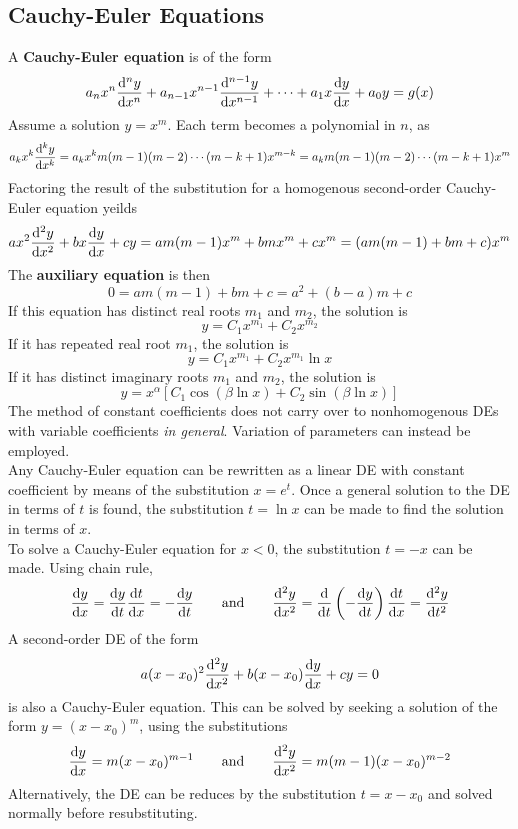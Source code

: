 \documentclass[12pt, A4]{article}
\begin{document}
		\subsection{Cauchy-Euler Equations}
			A \textbf{Cauchy-Euler equation} is of the form
				\[a_nx^n\dv[n]{y}{x} + a_{n - 1}x^{n - 1}\dv[n - 1]{y}{x} + \cdots + a_1x\dv{y}{x} + a_0y = g(x)\]
				Assume a solution \(y = x^m\). Each term becomes a polynomial in \(n\), as
				\[
					a_kx^k\dv[k]{y}{x} 
						= a_kx^km(m - 1)(m - 2)\cdots(m - k + 1)x^{m - k} 
						= a_km(m - 1)(m - 2)\cdots(m - k + 1)x^m
				\]
				Factoring the result of the substitution for a homogenous second-order Cauchy-Euler equation yeilds
				\[
					ax^2\dv[2]{y}{x} + bx\dv{y}{x} + cy
						= am(m - 1)x^m + bmx^m + cx^m
						= (am(m - 1) + bm + c)x^m
				\]
				The \textbf{auxiliary equation} is then
				\[\boxed{
					0 = am(m - 1) + bm + c = a^2 + (b - a)m + c
				}\]
				If this equation has distinct real roots \(m_1\) and \(m_2\), the solution is
				\[y = C_1x^{m_1} + C_2x^{m_2}\]
				If it has repeated real root \(m_1\), the solution is
				\[y = C_1x^{m_1} + C_2x^{m_1}\ln x\]
				If it has distinct imaginary roots \(m_1\) and \(m_2\), the solution is
				\[y = x^\alpha[C_1\cos(\beta\ln x) + C_2\sin(\beta\ln x)]\]
			The method of constant coefficients does not carry over to nonhomogenous DEs with variable coefficients \textit{in general}. Variation of parameters can instead be employed. \\
			Any Cauchy-Euler equation can be rewritten as a linear DE with constant coefficient by means of the substitution \(x = e^t\). Once a general solution to the DE in terms of \(t\) is found, the substitution \(t = \ln x\) can be made to find the solution in terms of \(x\). \\
			To solve a Cauchy-Euler equation for \(x < 0\), the substitution \(t = -x\) can be made. Using chain rule,
				\[
					\dv{y}{x} = \dv{y}{t}\dv{t}{x} = -\dv{y}{t} \qquad \text{and} \qquad
					\dv[2]{y}{x} = \dv{t}\left(-\dv{y}{t}\right)\dv{t}{x} = \dv[2]{y}{t}
				\]
			A second-order DE of the form
				\[a(x - x_0)^2\dv[2]{y}{x} + b(x - x_0)\dv{y}{x} + cy = 0\]
				is also a Cauchy-Euler equation. This can be solved by seeking a solution of the form \(y = (x - x_0)^m\), using the substitutions
				\[
					\dv{y}{x} = m(x - x_0)^{m - 1} \qquad \text{and} \qquad
						\dv[2]{y}{x} = m(m - 1)(x - x_0)^{m - 2}
				\]
				Alternatively, the DE can be reduces by the substitution \(t = x - x_0\) and solved normally before resubstituting.
\end{document}
